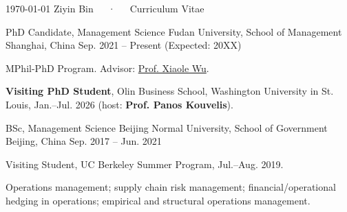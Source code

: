 \documentclass[11pt, letterpaper]{awesome-cv}
\begin{document}
\makecvheader
\makecvfooter
  {\today}
  {Ziyin Bin~~~·~~~Curriculum Vitae}
  {\thepage}

\begin{cventries}
  \cventry
    {PhD Candidate, Management Science}     %
    {Fudan University, School of Management}%
    {Shanghai, China}                       %
    {Sep. 2021 -- Present (Expected: 20XX)} %
    {
      \begin{cvitems}
        \item {MPhil-PhD Program. Advisor: \href{https://www.fdsm.fudan.edu.cn/en/}{Prof. Xiaole Wu}.}
        \item {\textbf{Visiting PhD Student}, Olin Business School, Washington University in St. Louis, Jan.--Jul. 2026 (host: \textbf{Prof. Panos Kouvelis}).}
      \end{cvitems}
    }

  \cventry
    {BSc, Management Science}
    {Beijing Normal University, School of Government}
    {Beijing, China}
    {Sep. 2017 -- Jun. 2021}
    {
      \begin{cvitems}
        \item {Visiting Student, UC Berkeley Summer Program, Jul.--Aug. 2019.}
      \end{cvitems}
    }
\end{cventries}

\begin{cvparagraph}
Operations management; supply chain risk management; financial/operational hedging in operations; empirical and structural operations management.
\end{cvparagraph}
\end{document}
